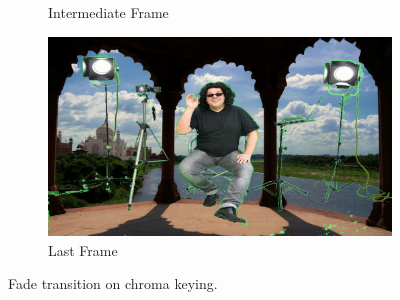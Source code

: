 \documentclass[a4paper]{article}
\begin{document}
\begin{figure}[H]
\begin{subfigure}[b]{.3\textwidth}
        \caption{Intermediate Frame}
    \end{subfigure}
    \hfill
    \begin{subfigure}[b]{.3\textwidth}
        \centering
        \includegraphics[width=\textwidth]{output/fade_transition_25.jpg}
        \caption{Last Frame}
    \end{subfigure}
    \hfill
    \caption{Fade transition on chroma keying.}
    \label{fig:transition}
\end{figure}
\end{document}
